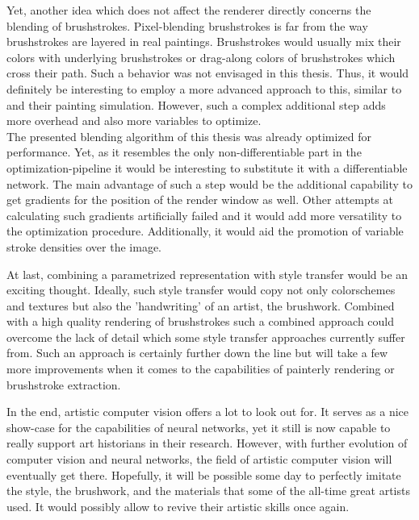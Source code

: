 Yet, another idea which does not affect the renderer directly concerns the blending of brushstrokes.
Pixel-blending brushstrokes is far from the way brushstrokes are layered in real paintings.
Brushstrokes would usually mix their colors with underlying brushstrokes or drag-along colors of brushstrokes which cross their path.
Such a behavior was not envisaged in this thesis.
Thus, it would definitely be interesting to employ a more advanced approach to this, similar to \citeauthor*{wetbrush} and their painting simulation.
However, such a complex additional step adds more overhead and also more variables to optimize.\\
The presented blending algorithm of this thesis was already optimized for performance.
Yet, as it resembles the only non-differentiable part in the optimization-pipeline it would be interesting to substitute it with a differentiable network.
The main advantage of such a step would be the additional capability to get gradients for the position of the render window as well.
Other attempts at calculating such gradients artificially failed and it would add more versatility to the optimization procedure.
Additionally, it would aid the promotion of variable stroke densities over the image.

At last, combining a parametrized representation with style transfer would be an exciting thought.
Ideally, such style transfer would copy not only colorschemes and textures but also the 'handwriting' of an artist, the brushwork.
Combined with a high quality rendering of brushstrokes such a combined approach could overcome the lack of detail which some style transfer approaches currently suffer from.
Such an approach is certainly further down the line but will take a few more improvements when it comes to the capabilities of painterly rendering or brushstroke extraction.

In the end, artistic computer vision offers a lot to look out for.
It serves as a nice show-case for the capabilities of neural networks, yet it still is now capable to really support art historians in their research.
However, with further evolution of computer vision and neural networks, the  field of artistic computer vision will eventually get there.
Hopefully, it will be possible some day to perfectly imitate the style, the brushwork, and the materials that some of the all-time great artists used.
It would possibly allow to revive their artistic skills once again.
